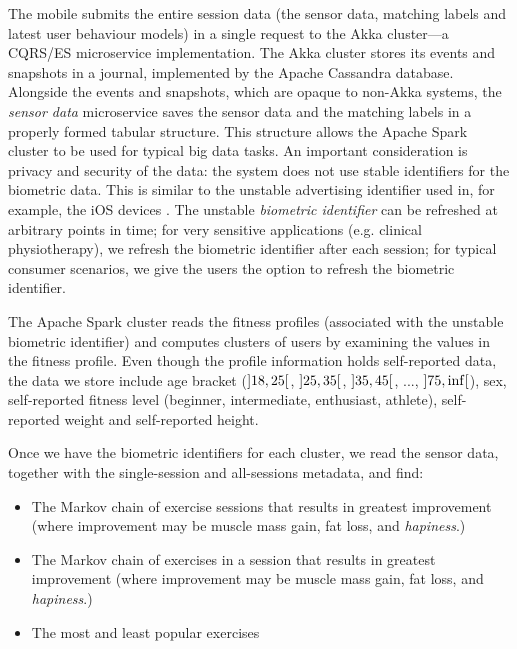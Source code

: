 \documentclass[a4paper, 10 pt, conference]{IEEEtran}
\begin{document}
The mobile submits the entire session data (the sensor data, matching labels and latest user behaviour models) in a single request to the Akka \cite{akka} cluster---a CQRS/ES \cite{cqrs-es} microservice implementation. The Akka cluster stores its events and snapshots in a journal, implemented by the Apache Cassandra \cite{apache-cassandra} database. Alongside the events and snapshots, which are opaque to non-Akka systems, the \emph{sensor data} microservice saves the sensor data and the matching labels in a properly formed tabular structure. This structure allows the Apache Spark \cite{apache-spark} cluster to be used for typical big data tasks. An important consideration is privacy and security of the data: the system does not use stable identifiers for the biometric data. This is similar to the unstable advertising identifier used in, for example, the iOS devices \cite{ios-advertising-identifier}. The unstable \emph{biometric identifier} can be refreshed at arbitrary points in time; for very sensitive applications (e.g. clinical physiotherapy), we refresh the biometric identifier after each session; for typical consumer scenarios, we give the users the option to refresh the biometric identifier.

The Apache Spark cluster reads the fitness profiles (associated with the unstable biometric identifier) and computes clusters of users by examining the values in the fitness profile. Even though the profile information holds self-reported data, the data we store include age bracket ($\interval[open]{18}{25}$, $\interval[open]{25}{35}$, $\interval[open]{35}{45}$, ..., $\interval[open]{75}{\inf}$), sex, self-reported fitness level (beginner, intermediate, enthusiast, athlete), self-reported weight and self-reported height.

Once we have the biometric identifiers for each cluster, we read the sensor data, together with the single-session and all-sessions metadata, and find:

\begin{itemize}
\item The Markov chain of exercise sessions that results in greatest improvement (where improvement may be muscle mass gain, fat loss, and \emph{hapiness}.)
\item The Markov chain of exercises in a session that results in greatest improvement (where improvement may be muscle mass gain, fat loss, and \emph{hapiness}.)
\item The most and least popular exercises
\end{itemize}
\end{document}
